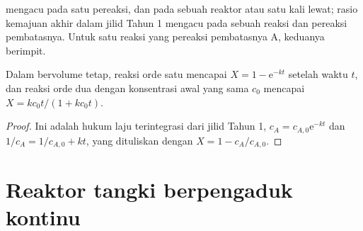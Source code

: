  mengacu pada satu pereaksi, dan pada sebuah reaktor atau satu
kali lewat; rasio kemajuan akhir dalam jilid Tahun 1 mengacu pada sebuah
reaksi dan pereaksi pembatasnya. Untuk satu reaksi yang pereaksi
pembatasnya A, keduanya berimpit.

\begin{proposition}\label{prop:b2:continuous-reactors:batch}
Dalam  bervolume tetap, reaksi orde satu mencapai 
$X = 1 - \mathrm e^{-kt}$ setelah waktu $t$, dan reaksi orde dua dengan
konsentrasi awal yang sama $c_0$ mencapai 
$X =
kc_0t/(1 + kc_0t)$.
\end{proposition}

\begin{proof}
Ini adalah hukum laju terintegrasi dari jilid Tahun 1,
$c_A = c_{A,0}
\mathrm e^{-kt}$ dan $1/c_A = 1/c_{A,0} + kt$, yang
dituliskan dengan $X = 1 -
c_A/c_{A,0}$.
\end{proof}

\section{Reaktor tangki berpengaduk kontinu}

